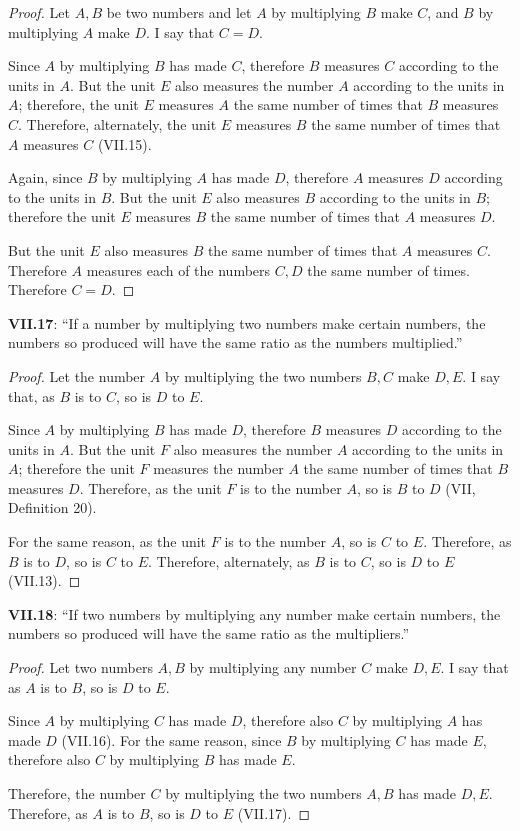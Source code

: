\documentclass{article}
\begin{document}
\begin{proof}
Let $A,B$ be two numbers and let $A$ by multiplying $B$ make $C$,
and $B$ by multiplying $A$ make $D$. I say that $C=D$.

Since $A$ by multiplying $B$ has made $C$,
therefore $B$ measures $C$ according to the units in $A$. But the unit $E$ also measures
the number $A$ according to the units in $A$; therefore, 
the unit $E$ measures $A$ the same number of times that $B$ measures $C$. 
Therefore, alternately, the unit $E$ measures $B$ the same number of times that 
$A$ measures $C$ (VII.15).

Again, since $B$ by multiplying $A$ has made $D$,
therefore $A$ measures $D$ according to the units in $B$. But the 
unit $E$ also measures $B$ according to the units in $B$; therefore 
the unit $E$ measures $B$ the same number of times that $A$ measures $D$.

But the unit $E$ also measures $B$ the same number of times that $A$ measures $C$.
Therefore $A$ measures each of the numbers $C,D$ the same number of times. Therefore
$C=D$.
\end{proof}


\textbf{VII.17}: ``If a number by multiplying two numbers make certain numbers, the numbers so produced will have the same ratio as the numbers multiplied.''

\begin{proof}
Let the number $A$ by multiplying the two numbers $B,C$ make $D,E$.
I say that, as $B$ is to $C$, so is $D$ to $E$.

Since $A$ by multiplying $B$ has made $D$, therefore
$B$ measures $D$ according to the units in $A$.
But the unit $F$ also measures the number $A$ according to the units in $A$;
therefore the unit $F$ measures the number $A$ the same number of times that $B$ measures $D$.
Therefore, as the unit $F$ is to the number $A$, so is $B$ to $D$ (VII, Definition 20).

For the same reason, as the unit $F$ is to the number $A$, so is $C$ to $E$.
Therefore, as $B$ is to $D$, so is $C$ to $E$.
Therefore, alternately, as $B$ is to $C$, so is $D$ to $E$ (VII.13).
\end{proof}


\textbf{VII.18}: ``If two numbers by multiplying any number make certain numbers, the numbers so produced will have the same ratio as the multipliers.''

\begin{proof}
Let two numbers $A,B$ by multiplying any number $C$ make $D,E$. I say that
as $A$ is to $B$, so is $D$ to $E$.

Since $A$ by multiplying $C$ has made $D$,
therefore also $C$ by multiplying $A$ has made $D$ (VII.16).
For the same reason, since $B$ by multiplying $C$ has made $E$, therefore also
$C$ by multiplying $B$ has made $E$.

Therefore, the number $C$ by multiplying the two numbers $A,B$ has made $D,E$.
Therefore, as $A$ is to $B$, so is $D$ to $E$ (VII.17).
\end{proof}
\end{document}
